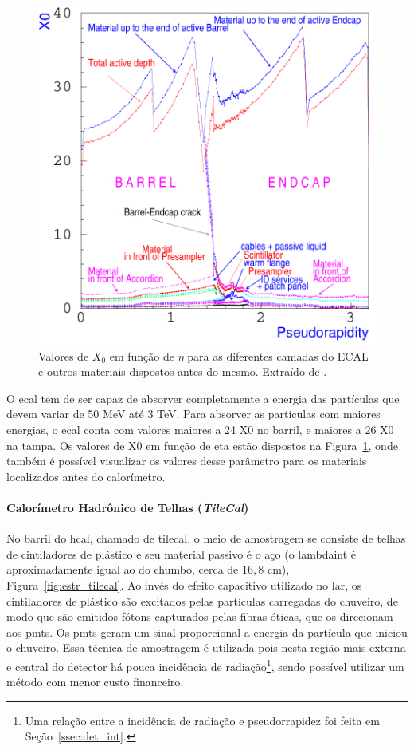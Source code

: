 \begin{figure}[h!t]
\centering
\includegraphics[width=.6\textwidth]{imagens/cal_em_x0.pdf}
\caption[Valores de $X_0$ em função de $\eta$ para as diferentes camadas do ECAL
e outros materiais dispostos antes do mesmo]{Valores de $X_0$ em função de $\eta$ para as diferentes camadas do ECAL
e outros materiais dispostos antes do mesmo. Extraído de \cite{cal_tdr}.}
\label{fig:cal_em_x0}
\end{figure}


O \gls{ecal} tem de ser capaz de absorver completamente a energia
das partículas que devem variar de 50 MeV até 3 TeV. 
Para absorver as partículas com maiores energias, o \gls{ecal} conta com valores
maiores a 24 \gls{X0} no barril, e maiores a 26 \gls{X0} na tampa. Os valores de \gls{X0} em 
função de \gls{eta} estão dispostos na Figura~\ref{fig:cal_em_x0}, onde também é possível
visualizar os valores desse parâmetro para os materiais localizados antes do
calorímetro.

\paragraph{Calorímetro Hadrônico de Telhas (\emph{TileCal})}
\label{par:cal_tilecal}


No barril do \gls{hcal}, chamado de \gls{tilecal}, o meio de amostragem se consiste de telhas de
cintiladores de plástico e seu material passivo é o aço (o \gls{lambdaint} é
aproximadamente igual ao do chumbo, cerca de $16,8$ cm), Figura~\ref{fig:estr_tilecal}. 
Ao invés do efeito capacitivo utilizado no \gls{lar}, os cintiladores de
plástico são excitados pelas partículas carregadas do chuveiro, de modo que são
emitidos fótons capturados pelas fibras óticas, que os direcionam aos
\glspl{pmt}. Os \glspl{pmt} geram um sinal proporcional a energia da partícula
que iniciou o chuveiro.
Essa técnica de amostragem é utilizada pois nesta região mais externa e central do detector 
há pouca incidência de radiação\footnote{Uma relação entre a incidência de
radiação e pseudorrapidez foi feita em Seção~\ref{ssec:det_int}.\label{fn:radiacao}}, 
sendo possível utilizar um método com menor custo financeiro.

